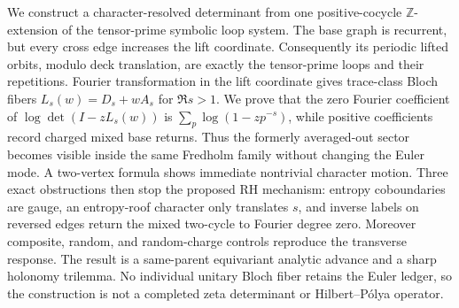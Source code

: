 We construct a character-resolved determinant from one positive-cocycle
$\mathbb Z$-extension of the tensor-prime symbolic loop system.  The base
graph is recurrent, but every cross edge increases the lift coordinate.
Consequently its periodic lifted orbits, modulo deck translation, are exactly
the tensor-prime loops and their repetitions.  Fourier transformation in the
lift coordinate gives trace-class Bloch fibers
$L_s(w)=D_s+wA_s$ for $\Re s>1$.  We prove that the zero Fourier coefficient
of $\log\det(I-zL_s(w))$ is
$\sum_p\log(1-zp^{-s})$, while positive coefficients record charged mixed
base returns.  Thus the formerly averaged-out sector becomes visible inside
the same Fredholm family without changing the Euler mode.  A two-vertex
formula shows immediate nontrivial character motion.  Three exact obstructions
then stop the proposed RH mechanism: entropy coboundaries are gauge, an
entropy-roof character only translates $s$, and inverse labels on reversed
edges return the mixed two-cycle to Fourier degree zero.  Moreover composite,
random, and random-charge controls reproduce the transverse response.  The
result is a same-parent equivariant analytic advance and a sharp holonomy
trilemma.  No
individual unitary Bloch fiber retains the Euler ledger, so the construction
is not a completed zeta determinant or Hilbert--P\'olya operator.
